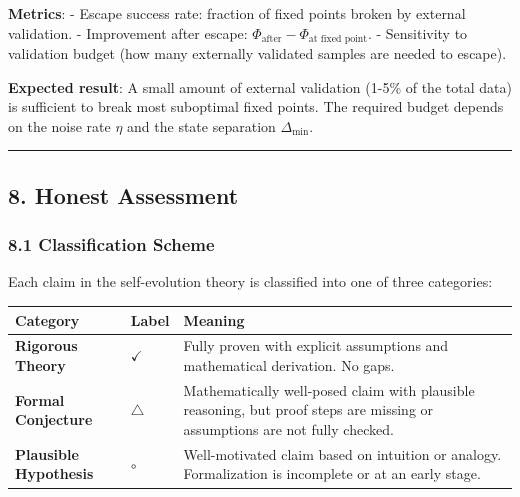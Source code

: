 \documentclass[
  12pt,
]{ctexart}
\begin{document}
\textbf{Metrics}: - Escape success rate: fraction of fixed points broken
by external validation. - Improvement after escape:
\(\Phi_{\text{after}} - \Phi_{\text{at fixed point}}\). - Sensitivity to
validation budget (how many externally validated samples are needed to
escape).

\textbf{Expected result}: A small amount of external validation (1-5\%
of the total data) is sufficient to break most suboptimal fixed points.
The required budget depends on the noise rate \(\eta\) and the state
separation \(\Delta_{\min}\).

\begin{center}\rule{0.5\linewidth}{0.5pt}\end{center}

\subsection{8. Honest Assessment}\label{honest-assessment}

\subsubsection{8.1 Classification Scheme}\label{classification-scheme}

Each claim in the self-evolution theory is classified into one of three
categories:

\begin{longtable}[]{@{}
  >{\raggedright\arraybackslash}p{}
  >{\raggedright\arraybackslash}p{}
  >{\raggedright\arraybackslash}p{}@{}}
\toprule\noalign{}
\begin{minipage}[b]{\linewidth}\raggedright
Category
\end{minipage} & \begin{minipage}[b]{\linewidth}\raggedright
Label
\end{minipage} & \begin{minipage}[b]{\linewidth}\raggedright
Meaning
\end{minipage} \\
\midrule\noalign{}
\endhead
\bottomrule\noalign{}
\endlastfoot
\textbf{Rigorous Theory} & \(\checkmark\) & Fully proven with explicit
assumptions and mathematical derivation. No gaps. \\
\textbf{Formal Conjecture} & \(\triangle\) & Mathematically well-posed
claim with plausible reasoning, but proof steps are missing or
assumptions are not fully checked. \\
\textbf{Plausible Hypothesis} & \(\circ\) & Well-motivated claim based
on intuition or analogy. Formalization is incomplete or at an early
stage. \\
\end{longtable}
\end{document}

